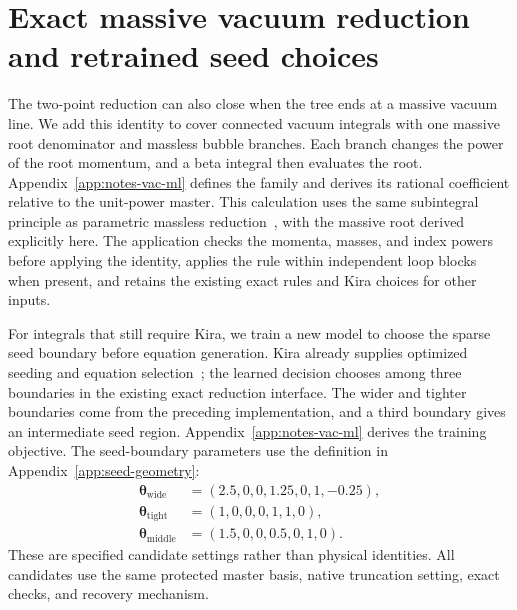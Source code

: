 \section{Exact massive vacuum reduction and retrained seed choices}
\label{sec:notes-vac-ml}
The two-point reduction can also close when the tree ends at a massive vacuum line. We add this identity to cover connected vacuum integrals with one massive root denominator and massless bubble branches. Each branch changes the power of the root momentum, and a beta integral then evaluates the root. Appendix~\ref{app:notes-vac-ml} defines the family and derives its rational coefficient relative to the unit-power master. This calculation uses the same subintegral principle as parametric massless reduction~\cite{Ruijl2017Forcer}, with the massive root derived explicitly here. The application checks the momenta, masses, and index powers before applying the identity, applies the rule within independent loop blocks when present, and retains the existing exact rules and Kira choices for other inputs.

For integrals that still require Kira, we train a new model to choose the sparse seed boundary before equation generation. Kira already supplies optimized seeding and equation selection~\cite{Kira3}; the learned decision chooses among three boundaries in the existing exact reduction interface. The wider and tighter boundaries come from the preceding implementation, and a third boundary gives an intermediate seed region. Appendix~\ref{app:notes-vac-ml} derives the training objective. The seed-boundary parameters use the definition in Appendix~\ref{app:seed-geometry}:
\begin{equation}
 \begin{split}
 \boldsymbol\theta_{\mathrm{wide}}&=(2.5,0,0,1.25,0,1,-0.25),\\
 \boldsymbol\theta_{\mathrm{tight}}&=(1,0,0,0,1,1,0),\\
 \boldsymbol\theta_{\mathrm{middle}}&=(1.5,0,0,0.5,0,1,0).
 \end{split}
 \label{eq:notes-vac-ml-choices}
\end{equation}
These are specified candidate settings rather than physical identities. All candidates use the same protected master basis, native truncation setting, exact checks, and recovery mechanism.

